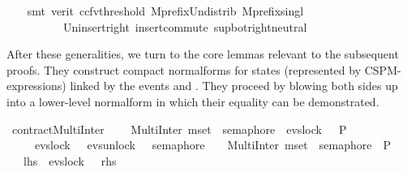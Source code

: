 \begin{isabellebody}
\ \ \isamarkupfalse%
\ {\isacharparenleft}{\kern0pt}smt\ {\isacharparenleft}{\kern0pt}verit{\isacharcomma}{\kern0pt}\ ccfv{\isacharunderscore}{\kern0pt}threshold{\isacharparenright}{\kern0pt}\ Mprefix{\isacharunderscore}{\kern0pt}Un{\isacharunderscore}{\kern0pt}distrib\ Mprefix{\isacharunderscore}{\kern0pt}singl\ \isanewline
\ \ \ \ \ \ \ \ \ \ Un{\isacharunderscore}{\kern0pt}insert{\isacharunderscore}{\kern0pt}right\ insert{\isacharunderscore}{\kern0pt}commute\ sup{\isacharunderscore}{\kern0pt}bot{\isachardot}{\kern0pt}right{\isacharunderscore}{\kern0pt}neutral{\isacharparenright}{\kern0pt}%
\endisatagproof
{\isafoldproof}%
%
\isadelimproof
%
\endisadelimproof
%
\begin{isamarkuptext}%
After these generalities, we turn to the core lemmas relevant to the subsequent proofs.
They construct compact normalforms for states (represented by CSPM-expressions) linked
by the events  and  . They proceed by blowing both sides
up into a lower-level normalform in which their equality can be demonstrated.%
\end{isamarkuptext}\isamarkuptrue%
\isamarkupfalse%
\ contractMultiInter{}\ {\isacharcolon}{\kern0pt}\ \isanewline
\ \ {\isachardoublequoteopen}MultiInter\ {\isacharparenleft}{\kern0pt}mset\ {\isacharbrackleft}{\kern0pt}{}{\isachardot}{\kern0pt}{\isachardot}{\kern0pt}{}{\isacharbrackright}{\kern0pt}{\isacharparenright}{\kern0pt}\ semaphore\ {\isacharbar}{\kern0pt}{\isacharbar}{\kern0pt}\ evs{\isachardot}{\kern0pt}lock\ {}\ {\isasymrightarrow}\ P\ \isanewline
\ \ \ {\isacharequal}{\kern0pt}\ \ evs{\isachardot}{\kern0pt}lock\ {}\ {\isasymrightarrow}\ {\isacharparenleft}{\kern0pt}{\isacharparenleft}{\kern0pt}evs{\isachardot}{\kern0pt}unlock\ {}\ {\isasymrightarrow}\ semaphore\ {}\ \ {\isacharbar}{\kern0pt}{\isacharbar}{\kern0pt}{\isacharbar}{\kern0pt}\ MultiInter\ {\isacharparenleft}{\kern0pt}mset\ {\isacharbrackleft}{\kern0pt}{}{\isachardot}{\kern0pt}{\isachardot}{\kern0pt}{}{\isacharbrackright}{\kern0pt}{\isacharparenright}{\kern0pt}\ semaphore{\isacharparenright}{\kern0pt}\ {\isacharbar}{\kern0pt}{\isacharbar}{\kern0pt}\ P{\isacharparenright}{\kern0pt}{\isachardoublequoteclose}\isanewline
\ \ {\isacharparenleft}{\kern0pt}\ {\isachardoublequoteopen}{\isacharquery}{\kern0pt}lhs\ {\isacharequal}{\kern0pt}\ evs{\isachardot}{\kern0pt}lock\ {}\ {\isasymrightarrow}\ {\isacharquery}{\kern0pt}rhs{\isachardoublequoteclose}{\isacharparenright}{\kern0pt}\isanewline

\end{isabellebody}
